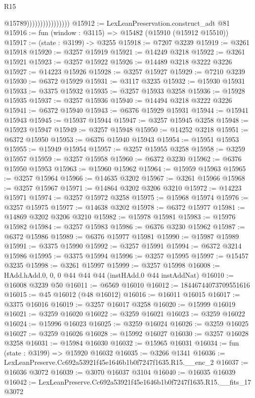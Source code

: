 \begin{lexlean}{R15}
\begin{coremodule}
                                    @15789))))))))))))))))
@15912 := LexLeanPreservation.construct_adt @81
@15916 := fun (window : @3115) => @15482 (@15910 (@15912 @15510))
@15917 := (state : @3199) -> @3255
@15918 := @7207 @3239
@15919 := @3261 @15918
@15920 := @3257 @15919
@15921 := @14249 @3218
@15922 := @3261 @15921
@15923 := @3257 @15922
@15926 := @14489 @3218 @3222 @3226
@15927 := @14223 @15926
@15928 := @3257 @15927
@15929 := @7210 @3239
@15930 := @6372 @15929
@15931 := @3117 @3235
@15932 := @15930 @15931
@15933 := @3375 @15932
@15935 := @3257 @15933 @3258
@15936 := @15928 @15935
@15937 := @3257 @15936
@15940 := @14494 @3218 @3222 @3226
@15941 := @6372 @15940
@15943 := @6376 @15929 @15931
@15944 := @15941 @15943
@15945 := @15937 @15944
@15947 := @3257 @15945 @3258
@15948 := @15923 @15947
@15949 := @3257 @15948
@15950 := @14252 @3218
@15951 := @6372 @15950
@15953 := @6376 @15940 @15943
@15954 := @15951 @15953
@15955 := @15949 @15954
@15957 := @3257 @15955 @3258
@15958 := @3259 @15957
@15959 := @3257 @15958
@15960 := @6372 @3230
@15962 := @6376 @15950 @15953
@15963 := @15960 @15962
@15964 := @15959 @15963
@15965 := @3257 @15964
@15966 := @14635 @3202
@15967 := @3261 @15966
@15968 := @3257 @15967
@15971 := @14864 @3202 @3206 @3210
@15972 := @14223 @15971
@15974 := @3257 @15972 @3258
@15975 := @15968 @15974
@15976 := @3257 @15975
@15977 := @14638 @3202
@15978 := @6372 @15977
@15981 := @14869 @3202 @3206 @3210
@15982 := @15978 @15981
@15983 := @15976 @15982
@15984 := @3257 @15983
@15986 := @6376 @3230 @15962
@15987 := @6372 @15986
@15989 := @6376 @15977 @15981
@15990 := @15987 @15989
@15991 := @3375 @15990
@15992 := @3257 @15991
@15994 := @6372 @3214 @15986
@15995 := @3375 @15994
@15996 := @3257 @15995
@15997 := @15457 @3235
@15998 := @3261 @15997
@15999 := @3257 @15998
@16008 := HAdd.hAdd.{0, 0, 0} @44 @44 @44 (instHAdd.{0} @44 instAddNat)
@16010 := @16008 @3239 @50
@16011 := @6569 @16010
@16012 := 18446744073709551616
@16015 := @45 @16012 (@48 @16012)
@16016 := @16011 @16015
@16017 := @3375 @16016
@16019 := @3257 @16017 @3258
@16020 := @15999 @16019
@16021 := @3259 @16020
@16022 := @3259 @16021
@16023 := @3259 @16022
@16024 := @15996 @16023
@16025 := @3259 @16024
@16026 := @3259 @16025
@16027 := @3259 @16026
@16028 := @15992 @16027
@16030 := @3257 @16028 @3258
@16031 := @15984 @16030
@16032 := @15965 @16031
@16034 := fun (state : @3199) => @15920 @16032
@16035 := @3266 @1341
@16036 := LexLeanPreserve.Cc692a53921f45e1646b1b0f7247f1635.R15.__enc_2
@16037 := @16036 @3072
@16039 := @3070 @16037 @3104
@16040 := @16035 @16039
@16042 := LexLeanPreserve.Cc692a53921f45e1646b1b0f7247f1635.R15.__fits_17 @3072

\end{coremodule}
\end{lexlean}

